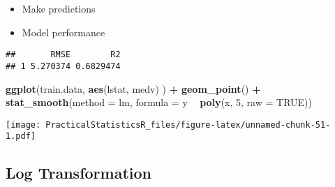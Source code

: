 \documentclass[]{article}
\newenvironment{Shaded}{\begin{snugshade}}{\end{snugshade}}
\newcommand{\DataTypeTok}[1]{\textcolor[rgb]{0.13,0.29,0.53}{#1}}
\newcommand{\DecValTok}[1]{\textcolor[rgb]{0.00,0.00,0.81}{#1}}
\newcommand{\KeywordTok}[1]{\textcolor[rgb]{0.13,0.29,0.53}{\textbf{#1}}}
\newcommand{\NormalTok}[1]{#1}
\newcommand{\OperatorTok}[1]{\textcolor[rgb]{0.81,0.36,0.00}{\textbf{#1}}}
\newcommand{\OtherTok}[1]{\textcolor[rgb]{0.56,0.35,0.01}{#1}}
\newcommand{\StringTok}[1]{\textcolor[rgb]{0.31,0.60,0.02}{#1}}
\providecommand{\tightlist}{%
  \setlength{\itemsep}{0pt}\setlength{\parskip}{0pt}}
\begin{document}
\begin{itemize}
\tightlist
\item
  Make predictions
\end{itemize}

\begin{Shaded}
\end{Shaded}

\begin{itemize}
\tightlist
\item
  Model performance
\end{itemize}

\begin{Shaded}
\end{Shaded}

\begin{verbatim}
##       RMSE        R2
## 1 5.270374 0.6829474
\end{verbatim}

\begin{Shaded}
\begin{Highlighting}[]
\KeywordTok{ggplot}\NormalTok{(train.data, }\KeywordTok{aes}\NormalTok{(lstat, medv) ) }\OperatorTok{+}
\StringTok{  }\KeywordTok{geom_point}\NormalTok{() }\OperatorTok{+}
\StringTok{  }\KeywordTok{stat_smooth}\NormalTok{(}\DataTypeTok{method =}\NormalTok{ lm, }\DataTypeTok{formula =}\NormalTok{ y }\OperatorTok{~}\StringTok{ }\KeywordTok{poly}\NormalTok{(x, }\DecValTok{5}\NormalTok{, }\DataTypeTok{raw =} \OtherTok{TRUE}\NormalTok{))}
\end{Highlighting}
\end{Shaded}

\texttt{[image: PracticalStatisticsR\_files/figure-latex/unnamed-chunk-51-1.pdf]}

\hypertarget{log-transformation}{%
\subsection{Log Transformation}\label{log-transformation}}
\end{document}
